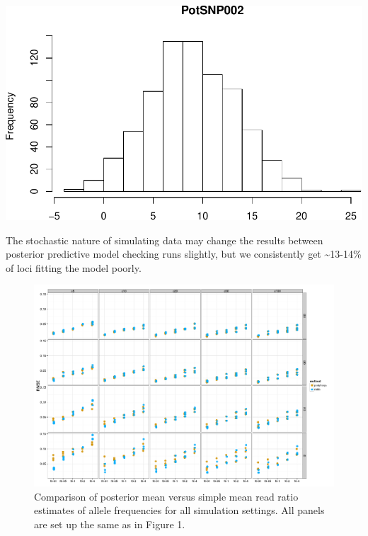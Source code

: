 \documentclass[]{article}
\newcommand{\beginsupplement}{%
        \setcounter{table}{0}
        \renewcommand{\thetable}{S\arabic{table}}%
        \setcounter{figure}{0}
        \renewcommand{\thefigure}{S\arabic{figure}}%
     }
\begin{document}
\includegraphics{supplement_files/figure-latex/unnamed-chunk-6-1.pdf}

The stochastic nature of simulating data may change the results between
posterior predictive model checking runs slightly, but we consistently
get \textasciitilde{}13-14\% of loci fitting the model poorly.

\beginsupplement

\begin{figure}[b]
\centering
\includegraphics[width=\textwidth]{pdf/figS1}
\caption{Comparison of posterior mean versus simple mean read ratio estimates of allele frequencies for all simulation settings. All panels are set up the same as in Figure 1.}
\end{figure}
\end{document}
